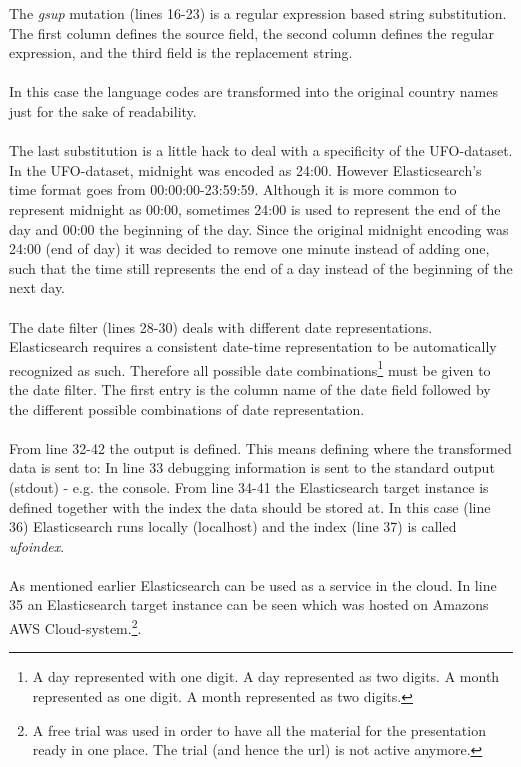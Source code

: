 \documentclass[bibliography=totoc]{article}
\begin{document}
The \textit{gsup} mutation (lines 16-23) is a regular expression based string substitution.
The first column defines the source field, the second column defines the regular expression,
and the third field is the replacement string.
\\
\\
In this case the language codes are transformed into the original country names
just for the sake of readability.
\\
\\
The last substitution is a little hack to deal with a specificity of the UFO-dataset.
In the UFO-dataset, midnight was encoded as 24:00. However Elasticsearch's time format goes from
00:00:00-23:59:59. Although it is more common to represent midnight as 00:00, sometimes
24:00 is used to represent the end of the day and 00:00 the beginning of the day.
Since the original midnight encoding was 24:00 (end of day) it was decided to 
remove one minute instead of adding one, such that the time still represents the end 
of a day instead of the beginning of the next day.
\\
\\
The date filter (lines 28-30) deals with different date representations.
Elasticsearch requires a consistent date-time representation to be automatically
recognized as such. Therefore all possible date combinations\footnote{A day represented with one digit. A day represented as two digits. A month represented as one digit. A month represented as two digits.} must be 
given to the date filter.
The first entry is the column name of the date field followed by the 
different possible combinations of date representation.
\\
\\
From line 32-42 the output is defined. This means defining where the transformed data is 
sent to:
In line 33 debugging information is sent to the standard output (stdout) - e.g. the console.
From line 34-41 the Elasticsearch target instance is defined together with the 
index the data should be stored at. In this case (line 36) Elasticsearch
runs locally (localhost) and the index (line 37) is called \textit{ufoindex}.
\\
\\
As mentioned earlier Elasticsearch can be used as a service in the cloud. In line 
35 an Elasticsearch target instance can be seen which was hosted on Amazons AWS Cloud-system.\footnote{A free trial was used in order to have all the material for the presentation ready in one place. The trial (and hence the url) is not active anymore.}.
\end{document}
